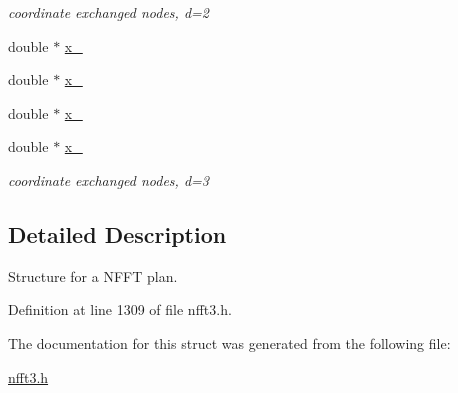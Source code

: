 \begin{CompactItemize}
\begin{CompactList}\small\item\em coordinate exchanged nodes, d=2 \item\end{CompactList}\item 
\hypertarget{structnsfft__plan_56345708a95cbcd3ee2ebf472607f274}{
double $\ast$ \hyperlink{structnsfft__plan_56345708a95cbcd3ee2ebf472607f274}{x\_}}
\label{structnsfft__plan_56345708a95cbcd3ee2ebf472607f274}

\item 
\hypertarget{structnsfft__plan_d47d5d52d2abf71be638f1b6859c3080}{
double $\ast$ \hyperlink{structnsfft__plan_d47d5d52d2abf71be638f1b6859c3080}{x\_}}
\label{structnsfft__plan_d47d5d52d2abf71be638f1b6859c3080}

\item 
\hypertarget{structnsfft__plan_b67c4a556040bc7699980cf02bf6c8a7}{
double $\ast$ \hyperlink{structnsfft__plan_b67c4a556040bc7699980cf02bf6c8a7}{x\_}}
\label{structnsfft__plan_b67c4a556040bc7699980cf02bf6c8a7}

\item 
\hypertarget{structnsfft__plan_ee5ad936bb790f00bf0797c94e185549}{
double $\ast$ \hyperlink{structnsfft__plan_ee5ad936bb790f00bf0797c94e185549}{x\_}}
\label{structnsfft__plan_ee5ad936bb790f00bf0797c94e185549}

\begin{CompactList}\small\item\em coordinate exchanged nodes, d=3 \item\end{CompactList}\end{CompactItemize}


\subsection{Detailed Description}
Structure for a NFFT plan. 

Definition at line 1309 of file nfft3.h.

The documentation for this struct was generated from the following file:\begin{CompactItemize}
\item 
\hyperlink{nfft3_8h}{nfft3.h}\end{CompactItemize}
